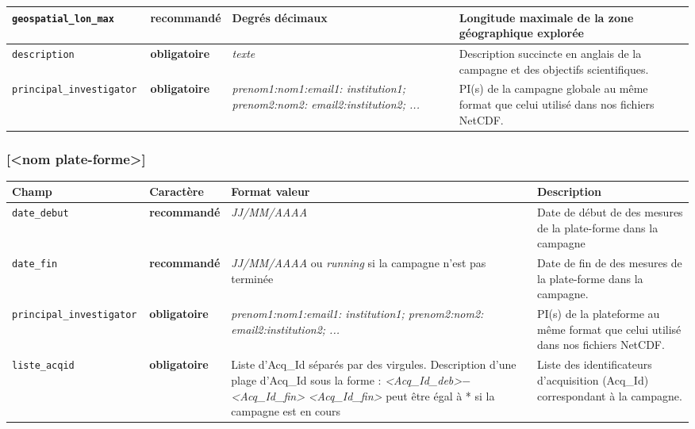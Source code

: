 \begin{tabular}{|p{4.3cm}|p{2.2cm}|p{3.9cm}|p{5.5cm}|}
\hline 
\texttt{geospatial\_lon\_max }& \textbf{recommandé} & Degrés décimaux & Longitude maximale de la zone géographique explorée \\
\hline 
\texttt{description }& \textbf{obligatoire} & \textit{texte} & Description succincte en anglais de la campagne et des objectifs scientifiques. \\
\hline 
\texttt{principal\_investigator }& \textbf{obligatoire} & \textit{prenom1:nom1:email1:
institution1; prenom2:nom2:
email2:institution2; ...} & PI(s) de la campagne globale au même format que celui utilisé dans nos fichiers NetCDF.\\
\hline 


\end{tabular}
\saute

\subsubsection{[<nom plate-forme>]}


\saute
\noindent\begin{tabular}{|p{4.3cm}|p{2.1cm}|p{4.7cm}|p{5cm}|}
\hline 
Champ& Caractère& Format valeur& Description \\
\hline 

\texttt{date\_debut}& \textbf{recommandé} & \textit{JJ/MM/AAAA} & Date de début de des mesures de la plate-forme dans la campagne\\
\hline 
\texttt{date\_fin }& \textbf{recommandé} & \textit{JJ/MM/AAAA} ou \textit{running} si la  campagne n'est pas terminée & Date de fin de des mesures de la plate-forme dans la campagne. \\
\hline 
\texttt{principal\_investigator }& \textbf{obligatoire} & \textit{prenom1:nom1:email1:
institution1; prenom2:nom2:
email2:institution2; ...} & PI(s) de la plateforme au même format que celui utilisé dans nos fichiers NetCDF. \\
\hline 

\texttt{liste\_acqid }& \textbf{obligatoire} & Liste d'Acq\_Id séparés par des virgules.\newline
Description d'une plage d'Acq\_Id sous la forme :\newline
\textit{<Acq\_Id\_deb>$-$<Acq\_Id\_fin>}
\textit{<Acq\_Id\_fin>} peut être égal à * si la campagne est en cours & Liste des identificateurs d'acquisition (Acq\_Id) correspondant à la campagne.\\
\hline 

\end{tabular}
\saute

